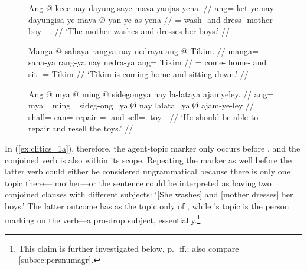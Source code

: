 \begin{figure}[h]
\pex\label{ex:clitics_1}
\a\label{ex:clitics_1a}\begingl
	\gla Ang @ kece nay dayungisaye māva yanjas yena. //
	\glb ang= ket-ye nay dayungisa-ye māva-Ø yan-ye-as yena //
	\glc \AgtT{}= wash-\TsgF{} and dress-\TsgF{} mother-\Top{}
		boy-\Pl{}-\Parg{} \TsgF{}.\Gen{} //
	\glft `The mother washes and dresses her boys.' //
\endgl

\a\label{ex:clitics_1b}\begingl
	\gla Manga @ sahaya rangya nay nedraya ang @ Tikim. //
	\glb manga= saha-ya rang-ya nay nedra-ya ang= Tikim //
	\glc \Prog{}= come-\TsgM{} home-\Loc{} and sit-\TsgM{} \Aarg{}= Tikim //
	\glft `Tikim is coming home and sitting down.' //
\endgl

\a\label{ex:clitics_1c}\begingl
	\gla Ang @ mya @ ming @ sidegongya nay la-lataya ajamyeley. //
	\glb ang= mya= ming= sideg-ong=ya.Ø nay la\til{}lata=ya.Ø ajam-ye-ley //
	\glc \AgtT{}= shall= can= repair-\Irr{}=\TsgM{}.\Top{} and
		\Iter{}\til{}sell=\TsgM{}.\Top{} toy-\Pl{}-\PargI{} //
	\glft `He should be able to repair and resell the toys.' //
\endgl
\xe
\end{figure}

\label{clitics_preverb_top}
In (\ref{ex:clitics_1a}), therefore, the agent-topic 
marker  only occurs before , and
the conjoined verb  is also within
its scope. Repeating the marker as well before the latter verb could either be
considered ungrammatical because there is only one topic
there--- {mother}---or the sentence could be interpreted as
having two conjoined clauses with different subjects: `[She washes] and [mother
dresses] her boys.' The latter outcome has  as the topic only
of , while 's topic is the person
marking on the verb---a pro-drop subject, essentially.\footnote{This claim is
further investigated below, p.~\pageref{subsubsec:suffixes}\,ff.; also compare
\autoref{subsec:persnumagr}.}

